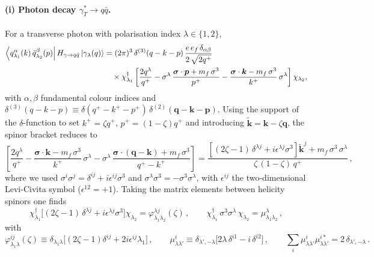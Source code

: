 \documentclass[11pt,a4paper]{article}
\newcommand{\ket}[1]{\left|#1\right\rangle}
\newcommand{\bra}[1]{\left\langle#1\right|}
\newcommand{\vk}{\bm{k}}
\newcommand{\vp}{\bm{p}}
\newcommand{\vq}{\bm{q}}
\newcommand{\kt}{\widetilde{\bm{k}}}
\newcommand{\eps}{\epsilon}
\numberwithin{equation}{section}
\begin{document}
\paragraph{(i) Photon decay $\gamma^*_T\to q\bar q$.} For a transverse photon with polarisation
index $\lambda\in\{1,2\}$,
\begin{align}
\label{eq:Hgamma}
\bra{q^{\alpha}_{\lambda_{1}}(k)\,\bar{q}^{\beta}_{\lambda_{2}}(p)}H_{\gamma\rightarrow q\bar{q}}
\ket{\gamma_{\lambda}(q)} &= (2\pi)^{3}\, \delta^{(3)}(q-k-p)\,
\frac{e\,e_{f}\,\delta_{\alpha\beta}}{2\,\sqrt{2q^{+}}}\, \notag\\
&\quad\times\chi^{\dagger}_{\lambda_{1}}\left[\frac{2q^{\lambda}}{q^{+}}
-\sigma^{\lambda}\,\frac{\bm\sigma\cdot \vp+m_{f}\,\sigma^{3}}{p^{+}}
-\frac{\bm\sigma\cdot \vk-m_{f}\,\sigma^{3}}{k^{+}}\,\sigma^{\lambda}\right]\chi_{\lambda_{2}},
\end{align}
with $\alpha,\beta$ fundamental colour indices and $\delta^{(3)}(q-k-p)\equiv
\delta(q^+-k^+-p^+)\,\delta^{(2)}(\vq-\vk-\vp)$. Using the support of the
$\delta$-function to set $k^{+}=\zeta q^{+}$, $p^{+}=(1-\zeta)q^{+}$ and introducing
$\kt=\vk-\zeta\vq$, the spinor bracket reduces to
\begin{equation}
\label{eq:photonreduced}
\left[\frac{2q^{\lambda}}{q^{+}}-\frac{\bm\sigma\cdot \vk - m_{f}\,\sigma^{3}}{k^{+}}\,\sigma^{\lambda}
-\sigma^{\lambda}\, \frac{\bm\sigma\cdot (\vq-\vk)+m_{f}\,\sigma^{3}}{q^{+}-k^{+}}\right]
= \frac{\left[(2\zeta -1)\,\delta^{\lambda j} + i\epsilon^{\lambda j}\sigma^{3}\right]\kt^{j}
+m_{f}\,\sigma^{3}\,\sigma^{\lambda}}{\zeta\,(1-\zeta)\,q^{+}}\,,
\end{equation}
where we used $\sigma^{i}\sigma^{j} = \delta^{ij}+i\epsilon^{ij}\sigma^{3}$ and
$\sigma^{\lambda}\sigma^{3} = -\sigma^{3}\sigma^{\lambda}$, with $\eps^{ij}$ the two-dimensional
Levi-Civita symbol ($\eps^{12}=+1$). Taking the matrix elements between helicity spinors one
finds
\begin{equation}
\label{eq:phimudef}
\chi^{\dagger}_{\lambda_{1}}\big[(2\zeta -1)\,\delta^{\lambda j} + i\epsilon^{\lambda j}\sigma^{3}\big]
\chi_{\lambda_2}
=\varphi^{\lambda j}_{\lambda_{1}\lambda_2}(\zeta)\,,\qquad
\chi^{\dagger}_{\lambda_{1}}\,\sigma^{3}\sigma^{\lambda}\,\chi_{\lambda_{2}}
= \mu^{\lambda}_{\lambda_{1}\lambda_{2}}\,,
\end{equation}
with
\begin{equation}
\label{eq:phimu}
\varphi^{ij}_{\lambda_{1}\lambda}(\zeta) \equiv
\delta_{\lambda_{1}\lambda}\big[(2\zeta -1)\delta^{ij} +2i\epsilon^{ij}\lambda_{1}\big]\,,
\qquad
\mu^{i}_{\lambda\lambda'} \equiv \delta_{\lambda',-\lambda}\big[2\lambda\,\delta^{i1} -
i\,\delta^{i2}\big]\,,\qquad
\sum_{i}\mu^{i}_{\lambda\lambda'}\mu^{i*}_{\lambda\lambda'} = 2\,\delta_{\lambda',-\lambda}\,.
\end{equation}
\end{document}

